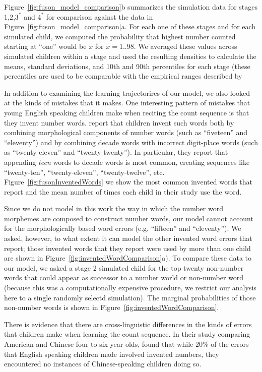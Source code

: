 \documentclass[10pt,letterpaper]{article}
\begin{document}
Figure~\ref{fig:fuson_model_comparison}b summarizes the simulation
data for stages 1,2,$3^*$ and $4^*$ for comparison against the
\citeauthor{FusRicBriar1982} data in
Figure~\ref{fig:fuson_model_comparison}a. For each one of these stages
and for each simulated child, we computed the probability that highest
number counted starting at ``one'' would be $x$ for $x=1..98$. We
averaged these values across simulated children within a stage and
used the resulting densities to calculate the means, standard
deviations, and 10th and 90th percentiles for each stage (these
percentiles are used to be comparable with the empirical ranges described
by \citeauthor{FusRicBriar1982}

In addition to examining the learning trajectorires of our model, we
also looked at the kinds of mistakes that it makes. One interesting
pattern of mistakes that young English speaking children make when
reciting the count sequence is that they invent number
words. \citeauthor{FusRicBriar1982} report that children invent such
words both by combining morphological components of number words (such
as ``fiveteen'' and ``eleventy'') and by combining decade words with
incorrect digit-place words (such as ``twenty-eleven'' and
``twenty-twenty''). In particular, they report that appending
\emph{teen} words to decade words is most common, creating sequences
like ``twenty-ten'', ``twenty-eleven'', ``twenty-twelve'', etc.
Figure~\ref{fig:fusonInventedWords} we show the most common invented
words that \citeauthor{FusRicBriar1982} report and the mean number of
times each child in their study use the word. 

Since we do not model in this work the way in which the number word
morphemes are composed to construct number words, our model cannot
account for the morphologically based word errors (e.g. ``fifteen''
and ``eleventy''). We asked, however, to what extent it can model the
other invented word errors that \citeauthor{FusRicBriar1982} report;
those invented words that they report were used by more than one child
are shown in Figure~\ref{fig:inventedWordComparison}a). To compare
these data to our model, we asked a stage 2 simulated child for the top
twenty non-number words that could appear as successor to a number
world or non-number word (because this was a computationally expensive
procedure, we restrict our analysis here to a single randomly selectd
simulation). The marginal probabilities of those non-number words is
shown in Figure~\ref{fig:inventedWordComparison}.

There is evidence that there are cross-linguistic differences in the
kinds of errors that children make when learning the count
sequence. In their study comparing American and Chinese four to six
year olds, \citeauthor{miller1987counting} found that while $20\%$ of
the errors that English speaking children made involved invented
numbers, they encountered no instances of Chinese-speaking children
doing so. 
\end{document}
